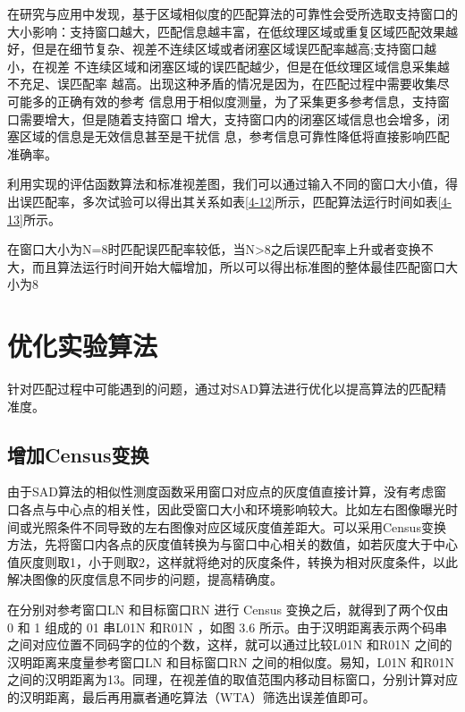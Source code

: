 在研究与应用中发现，基于区域相似度的匹配算法的可靠性会受所选取支持窗口的大小影响：支持窗口越大，匹配信息越丰富，在低纹理区域或重复区域匹配效果越好，但是在细节复杂、视差不连续区域或者闭塞区域误匹配率越高;支持窗口越小，在视差
不连续区域和闭塞区域的误匹配越少，但是在低纹理区域信息采集越不充足、误匹配率
越高。出现这种矛盾的情况是因为，在匹配过程中需要收集尽可能多的正确有效的参考
信息用于相似度测量，为了采集更多参考信息，支持窗口需要增大，但是随着支持窗口
增大，支持窗口内的闭塞区域信息也会增多，闭塞区域的信息是无效信息甚至是干扰信
息，参考信息可靠性降低将直接影响匹配准确率。

利用实现的评估函数算法和标准视差图，我们可以通过输入不同的窗口大小值，得出误匹配率，多次试验可以得出其关系如表\ref{4-12}所示，匹配算法运行时间如表\ref{4-13}所示。


在窗口大小为N=8时匹配误匹配率较低，当N>8之后误匹配率上升或者变换不大，而且算法运行时间开始大幅增加，所以可以得出标准图的整体最佳匹配窗口大小为8

\section{优化实验算法}

针对匹配过程中可能遇到的问题，通过对SAD算法进行优化以提高算法的匹配精准度。

\subsection{增加Census变换}


由于SAD算法的相似性测度函数采用窗口对应点的灰度值直接计算，没有考虑窗口各点与中心点的相关性，因此受窗口大小和环境影响较大。比如左右图像曝光时间或光照条件不同导致的左右图像对应区域灰度值差距大。可以采用Census变换方法，先将窗口内各点的灰度值转换为与窗口中心相关的数值，如若灰度大于中心值灰度则取1，小于则取2，这样就将绝对的灰度条件，转换为相对灰度条件，以此解决图像的灰度信息不同步的问题，提高精确度。


在分别对参考窗口LN 和目标窗口RN 进行 Census 变换之后，就得到了两个仅由 0 和 1 组成的 01 串L01N 和R01N ，如图 3.6 所示。由于汉明距离表示两个码串之间对应位置不同码字的位的个数，这样，就可以通过比较L01N 和R01N 之间的汉明距离来度量参考窗口LN 和目标窗口RN 之间的相似度。易知，L01N 和R01N 之间的汉明距离为13。同理，在视差值的取值范围内移动目标窗口，分别计算对应的汉明距离，最后再用赢者通吃算法（WTA）筛选出误差值即可。

